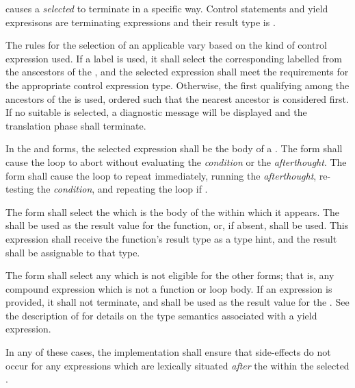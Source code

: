 \specsubsubitem
{} causes a \textit{selected}
 to terminate in a specific way. Control
statements and yield expresisons are terminating expressions and their result
type is .

\specsubsubitem
The rules for the selection of an applicable 
vary based on the kind of control expression used. If a label is used, it shall
select the corresponding labelled  from the
anscestors of the , and the selected expression
shall meet the requirements for the appropriate control expression type.
Otherwise, the first qualifying  among the
ancestors of the  is used, ordered such that
the nearest ancestor is considered first. If no suitable
 is selected, a diagnostic message will be
displayed and the translation phase shall terminate.

\specsubsubitem
In the  and  forms, the selected expression
shall be the body of a . The  form shall
cause the loop to abort without evaluating the \textit{condition} or the
\textit{afterthought}. The  form shall cause the loop to
repeat immediately, running the \textit{afterthought}, re-testing the
\textit{condition}, and repeating the loop if .

\specsubsubitem
The  form shall select the 
which is the body of the  within which it
appears. The  shall be used as the result value for the
function, or, if absent,  shall be used. This expression shall
receive the function's result type as a type hint, and the result shall be
assignable to that type.

\specsubsubitem
The  form shall select any
 which is not eligible for the other forms;
that is, any compound expression which is not a function or loop body. If an
expression is provided, it shall not terminate, and shall be used as the result
value for the . See the description of
 for details on the type semantics associated
with a yield expression.

\specsubsubitem
In any of these cases, the implementation shall ensure that side-effects do not
occur for any expressions which are lexically situated \textit{after} the
 within the selected
.

